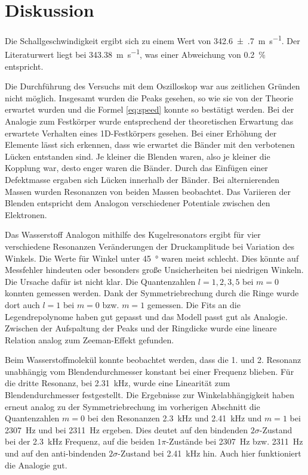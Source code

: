 \section{Diskussion}
\label{sec:Diskussion}

Die Schallgeschwindigkeit ergibt sich zu einem Wert von \SI{342.6(7)}{\meter\per\second}. Der Literaturwert liegt bei \SI{343.38}{\meter\per\second}, was einer Abweichung von \SI{0.2}{\percent} entspricht. 

Die Durchführung des Versuchs mit dem Oszilloskop war aus zeitlichen Gründen nicht möglich. 
Insgesamt wurden die Peaks gesehen, so wie sie von der Theorie erwartet wurden und die Formel \eqref{eq:speed} konnte so bestätigt werden. 
Bei der Analogie zum Festkörper wurde entsprechend der theoretischen Erwartung das erwartete Verhalten eines 1D-Festkörpers gesehen. Bei einer Erhöhung der Elemente lässt sich erkennen, dass wie erwartet die Bänder mit den verbotenen Lücken entstanden sind. Je kleiner die Blenden waren, also je kleiner die Kopplung war, desto enger waren die Bänder. 
Durch das Einfügen einer Defektmasse ergaben sich Lücken innerhalb der Bänder. 
Bei alternierenden Massen wurden Resonanzen von beiden Massen beobachtet.
Das Variieren der Blenden entspricht dem Analogon verschiedener Potentiale zwischen den Elektronen. 

Das Wasserstoff Analogon mithilfe des Kugelresonators ergibt für vier verschiedene Resonanzen Veränderungen der Druckamplitude bei Variation des Winkels. Die Werte für Winkel unter \SI{45}{\degree} waren meist schlecht. Dies könnte auf Messfehler hindeuten oder besonders große Unsicherheiten bei niedrigen Winkeln. Die Ursache dafür ist nicht klar. 
Die Quantenzahlen $l=1,2,3,5$ bei $m=0$ konnten gemessen werden. Dank der Symmetriebrechung durch die Ringe wurde dort auch $l = 1$ bei $m=0$ bzw. $m=1$ gemessen. Die Fits an die Legendrepolynome haben gut gepasst und das Modell passt gut als Analogie. 
Zwischen der Aufspaltung der Peaks und der Ringdicke wurde eine lineare Relation analog zum Zeeman-Effekt gefunden. 

Beim Wasserstoffmolekül konnte beobachtet werden, dass die 1. und 2. Resonanz  unabhängig vom Blendendurchmesser konstant bei einer Frequenz blieben. 
Für die dritte Resonanz, bei \SI{2.31}{\kilo\hertz}, wurde eine Linearität zum Blendendurchmesser festgestellt.
Die Ergebnisse zur Winkelabhängigkeit haben erneut analog zu der Symmetriebrechung im vorherigen Abschnitt die Quantenzahlen $m = 0$ bei den Resonanzen \SI{2.3}{\kilo\hertz} und \SI{2.41}{\kilo\hertz} und $m = 1$ bei \SI{2307}{\hertz} und bei \SI{2311}{\hertz} ergeben. Dies deutet auf den bindenden $2 \sigma$-Zustand bei der \SI{2.3}{\kilo\hertz} Frequenz, auf die beiden $1 \pi$-Zustände bei \SI{2307}{\hertz} bzw. \SI{2311}{\hertz} und auf den anti-bindenden $2 \sigma$-Zustand bei \SI{2.41}{\kilo\hertz} hin. 
Auch hier funktioniert die Analogie gut. 

